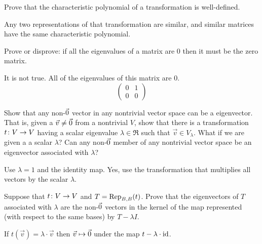 \begin{exercises}
    Prove that 
    the characteristic polynomial of a transformation is well-defined.
    \begin{answer}
      Any two representations of that transformation are similar, and
      similar matrices have the same characteristic polynomial.  
    \end{answer}
  \item Prove or disprove: if all the eigenvalues of a matrix are $0$ 
    then it must be the zero matrix.
    \begin{answer}
      It is not true.
      All of the eigenvalues of this matrix are $0$.
      \begin{equation*}
        \begin{pmatrix}
          0  &1  \\
          0  &0
        \end{pmatrix}
      \end{equation*}
    \end{answer}
  \recommended \item 
    \begin{exparts}
      \partsitem Show that any non-\( \zero \) vector in any nontrivial 
        vector space can be a eigenvector.
        That is, given a \( \vec{v}\neq\zero \) from a nontrivial \( V \),
        show that there is a transformation \( \map{t}{V}{V} \) having a scalar
        eigenvalue \( \lambda\in\Re \) such that \( \vec{v}\in V_\lambda \).
      \partsitem What if we are given a  a scalar \( \lambda \)?
        Can any non-\( \zero \) member of any
        nontrivial vector space be an eigenvector associated with \( \lambda \)?
    \end{exparts}
    \begin{answer}
      \begin{exparts}
        \partsitem Use \( \lambda=1 \) and the identity map.
        \partsitem Yes, use the transformation that multiplies all 
          vectors by the scalar \( \lambda \).
      \end{exparts}  
     \end{answer}
  \recommended \item 
    Suppose that \( \map{t}{V}{V} \) and \( T=\rep{t}{B,B} \).
    Prove that the eigenvectors of \( T \) associated with \( \lambda \) are
    the non-\( \zero \) vectors in the kernel of the map represented
    (with respect to the same bases) by \( T-\lambda I \).
    \begin{answer}
      If $t(\vec{v})=\lambda\cdot\vec{v}$ then 
      $\vec{v}\mapsto\zero$ under the map $t-\lambda\cdot\identity$.

\end{answer}
\end{exercises}
